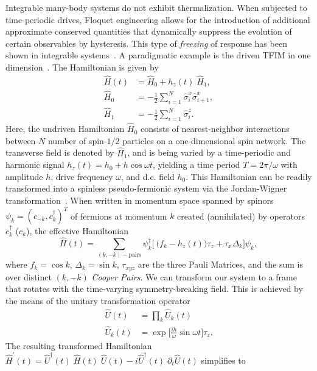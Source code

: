 \documentclass[%
reprint,
superscriptaddress,
amsmath,amssymb,
aps,
prb,
showkeys,
]{revtex4-2}
\begin{document}
Integrable many-body systems do not exhibit thermalization. When subjected to time-periodic drives, Floquet engineering allows for the introduction of additional approximate conserved quantities that dynamically suppress the evolution of certain observables by hysteresis. This type of \textit{freezing} of response
has been shown in integrable systems~\cite{roy_fate_2015}.
A paradigmatic example is  the driven TFIM in one dimension~\cite{stinchcombe_ising_1973}. The Hamiltonian is given by
\begin{align}
	\label{eq:tfim:hamilt}
	\hat{H}(t) &= \hat{H}_0 + h_z(t) \; \hat{H}_1,\\
	\hat{H}_0 &= -\frac{1}{2}\sum^N_{i=1} \hat{\sigma}^x_i \hat{\sigma}^x_{i+1},\\
	\hat{H}_1 &= -\frac{1}{2}\sum_{i=1}^N \hat{\sigma}^z_{i}.
\end{align}
Here, the undriven Hamiltonian $\hat{H}_0$ consists of nearest-neighbor interactions between $N$ number of  spin-$1/2$ particles on a one-dimensional spin network. The transverse field is denoted by $\hat{H}_1$, and is being varied by a time-periodic and harmonic signal $h_z(t) = h_0 + h\cos{\omega t}$, yielding a time period $T=2\pi/\omega$ with amplitude $h$, drive frequency $\omega$, and d.c. field $h_0$. This Hamiltonian can be readily transformed into a spinless pseudo-fermionic system via the Jordan-Wigner transformation~\cite{mbeng_quantum_2020}. When written in momentum space spanned by spinors $\psi_k = (c_{-k}, c^\dagger_k)^T$ of fermions at momentum $k$ created (annihilated) by operators $c^\dagger_k$ ($c_k$), the effective Hamiltonian
\begin{equation}
	\label{eq:TFIM:fermions}
	\hat{H}(t) = \sum_{(k,-k)-\mbox{pairs}} \psi^\dagger_k
	\Bigg[\ \bigg(f_k - h_z(t)\bigg)\tau_z +  \tau_x \Delta_k\Bigg]\psi_k ,
\end{equation}
where $f_k = \cos{k}$, $\Delta_k = \sin{k}$, $\tau_{xyz}$ are the three Pauli Matrices, and the sum is over distinct $(k, -k)$ \textit{Cooper Pairs}. We can transform our system to a frame that rotates with the time-varying symmetry-breaking field. This is achieved by the means of the unitary transformation operator~\cite{Engelhardt2013}
\begin{align}
	\label{eq:rotation:tfim}
	\hat{U}(t) &= \prod_k \hat{U}_k(t)\\
	\hat{U}_k(t) &= \exp{\Big[\frac{i h}{\omega}\sin{\omega t}\Big]\tau_z}.\nonumber
\end{align} 
The resulting transformed Hamiltonian $\hat{H}^\prime(t) = \hat{U}^\dagger(t)\;\hat{H}(t)\;\hat{U}(t)-i\hat{U}^\dagger(t)\;\partial_t\hat{U}(t)$ simplifies to
\end{document}
